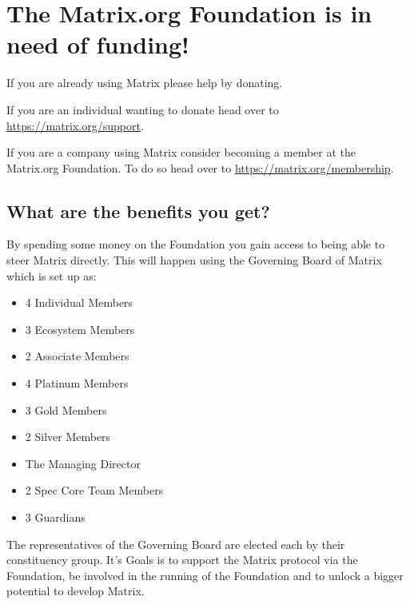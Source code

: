 \documentclass[../flyer.tex]{subfiles}
\begin{document}
\section*{The Matrix.org Foundation is in need of funding!}

If you are already using Matrix please help by donating.

If you are an individual wanting to donate head over to \url{https://matrix.org/support}.

If you are a company using Matrix consider becoming a member at the Matrix.org Foundation.
To do so head over to \url{https://matrix.org/membership}.

\subsection*{What are the benefits you get?}

By spending some money on the Foundation you gain access to being able to steer
Matrix directly. This will happen using the Governing Board of Matrix which is set up as:

\begin{itemize}
    \item 4 Individual Members
    \item 3 Ecosystem Members
    \item 2 Associate Members
    \item 4 Platinum Members
    \item 3 Gold Members
    \item 2 Silver Members
    \item The Managing Director
    \item 2 Spec Core Team Members
    \item 3 Guardians
\end{itemize}

The representatives of the Governing Board are elected each by their constituency group.
It's Goals is to support the Matrix protocol via the Foundation, be involved in the running of the Foundation
and to unlock a bigger potential to develop Matrix.
\end{document}

